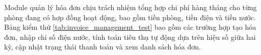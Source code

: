 Module quản lý hóa đơn chịu trách nhiệm tổng hợp chi phí hàng tháng cho từng phòng đang có hợp đồng hoạt động, bao gồm tiền phòng, tiền điện và tiền nước. Bảng kiểm thử \ref{tab:invoice_management_test} bao gồm các trường hợp tạo hóa đơn, nhập chỉ số điện nước, tính toán tiêu thụ tự động dựa trên hiệu số giữa hai kỳ, cập nhật trạng thái thanh toán và xem danh sách hóa đơn.